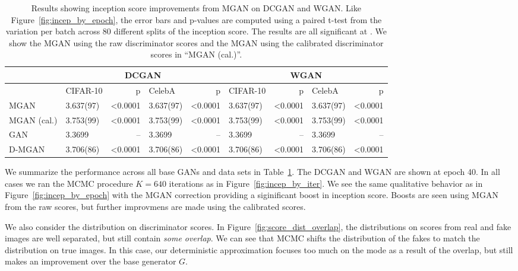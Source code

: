 \documentclass{article}
\begin{document}
\begin{table}[htbp]
\centering
    \caption{{\small
    Results showing inception score improvements from MGAN on DCGAN and WGAN\@.
    Like Figure~\ref{fig:incep_by_epoch}, the error bars and p-values are computed using a paired t-test from the variation per batch across 80 different splits of the inception score.
    The results are all significant at .
    We show the MGAN using the raw discriminator scores and the MGAN using the calibrated discriminator scores in ``MGAN (cal.)''.
    }}
    \label{tbl:inception}
{\scriptsize
\begin{tabular}{|l|l|r|l|r||l|r|l|r|}
\toprule
~                 & \multicolumn{4}{c}{DCGAN}                               & \multicolumn{4}{c}{WGAN} \\
\toprule
~                 & CIFAR-10         &      p   & CelebA         &      p   & CIFAR-10        &      p   & CelebA        &      p \\
\midrule
MGAN              &        3.637(97) &  <0.0001 &      3.637(97) &  <0.0001 &       3.637(97) &  <0.0001 &     3.637(97) &  <0.0001 \\
MGAN (cal.)       &        3.753(99) &  <0.0001 &      3.753(99) &  <0.0001 &       3.753(99) &  <0.0001 &     3.753(99) &  <0.0001 \\
GAN               &        3.3699    &       -- &      3.3699    &       -- &       3.3699    &       -- &     3.3699    &       -- \\
D-MGAN            &        3.706(86) &  <0.0001 &      3.706(86) &  <0.0001 &       3.706(86) &  <0.0001 &     3.706(86) &  <0.0001 \\
\bottomrule
\end{tabular}
}
\end{table}

We summarize the performance across all base GANs and data sets in Table~\ref{tbl:inception}.
The DCGAN and WGAN are shown at epoch 40.  %
In all cases we ran the MCMC procedure $K=640$ iterations as in Figure~\ref{fig:incep_by_iter}.
We see the same qualitative behavior as in Figure~\ref{fig:incep_by_epoch} with the MGAN correction providing a siginificant boost in inception score.
Boosts are seen using MGAN from the raw scores, but further improvmens are made using the calibrated scores.

We also consider the distribution on discriminator scores.
In Figure~\ref{fig:score_dist_overlap}, the distributions on scores from real and fake images are well separated, but still contain \emph{some overlap}.
We can see that MCMC shifts the distribution of the fakes to match the distribution on true images.
In this case, our deterministic approximation focuses too much on the mode as a result of the overlap, but still makes an improvement over the base generator $G$.
\end{document}
